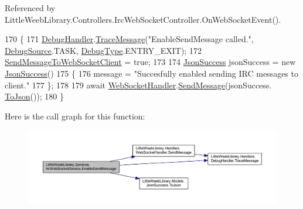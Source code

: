 Referenced by Little\+Weeb\+Library.\+Controllers.\+Irc\+Web\+Socket\+Controller.\+On\+Web\+Socket\+Event().


\begin{DoxyCode}
170         \{
171             \mbox{\hyperlink{class_little_weeb_library_1_1_handlers_1_1_debug_handler}{DebugHandler}}.\mbox{\hyperlink{class_little_weeb_library_1_1_handlers_1_1_debug_handler_afccb37dfd6b2114af72000c2f4fe4607}{TraceMessage}}(\textcolor{stringliteral}{"EnableSendMessage called."}, 
      \mbox{\hyperlink{namespace_little_weeb_library_1_1_handlers_a2a6ca0775121c9c503d58aa254d292be}{DebugSource}}.TASK, \mbox{\hyperlink{namespace_little_weeb_library_1_1_handlers_ab66019ed40462876ec4e61bb3ccb0a62}{DebugType}}.ENTRY\_EXIT);
172             \mbox{\hyperlink{class_little_weeb_library_1_1_services_1_1_irc_web_socket_service_abeb1251a64e640930814f582196f0058}{SendMessageToWebSocketClient}} = \textcolor{keyword}{true};
173 
174             \mbox{\hyperlink{class_little_weeb_library_1_1_models_1_1_json_success}{JsonSuccess}} jsonSuccess = \textcolor{keyword}{new} \mbox{\hyperlink{class_little_weeb_library_1_1_models_1_1_json_success}{JsonSuccess}}()
175             \{
176                 message = \textcolor{stringliteral}{"Succesfully enabled sending IRC messages to client."}
177             \};
178 
179             await \mbox{\hyperlink{class_little_weeb_library_1_1_handlers_1_1_web_socket_handler}{WebSocketHandler}}.\mbox{\hyperlink{class_little_weeb_library_1_1_handlers_1_1_web_socket_handler_a1de289d54d665a32c93478c68d3e6ad0}{SendMessage}}(jsonSuccess.
      \mbox{\hyperlink{class_little_weeb_library_1_1_models_1_1_json_success_a407103dc37a77aaf47a782296bab7518}{ToJson}}());
180         \}
\end{DoxyCode}
Here is the call graph for this function\+:\nopagebreak
\begin{figure}[H]
\begin{center}
\leavevmode
\includegraphics[width=350pt]{class_little_weeb_library_1_1_services_1_1_irc_web_socket_service_acd9aa44a2389caa8e997db49a646c448_cgraph}
\end{center}
\end{figure}
